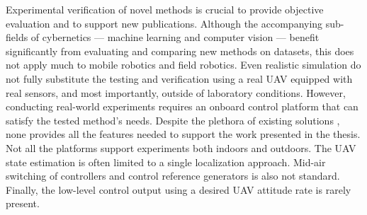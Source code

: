 \documentclass[a4paper,11pt,twoside,openright]{book}
\begin{document}
Experimental verification of novel methods is crucial to provide objective evaluation and to support new publications.
Although the accompanying sub-fields of cybernetics --- machine learning and computer vision --- benefit significantly from evaluating and comparing new methods on datasets, this does not apply much to mobile robotics and field robotics.
Even realistic simulation do not fully substitute the testing and verification using a real \ac{UAV} equipped with real sensors, and most importantly, outside of laboratory conditions.
However, conducting real-world experiments requires an onboard control platform that can satisfy the tested method's needs.
Despite the plethora of existing solutions \cite{sanchez2016aerostack, xiao2020xtdrone, furrer2016rotors, schmittle2018openuav, abeywardena2015design, mellado2013mavwork}, none provides all the features needed to support the work presented in the thesis.
Not all the platforms support experiments both indoors and outdoors.
The \ac{UAV} state estimation is often limited to a single localization approach.
Mid-air switching of controllers and control reference generators is also not standard.
Finally, the low-level control output using a desired \ac{UAV} attitude rate is rarely present.

\end{document}
